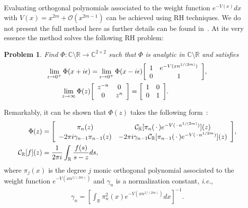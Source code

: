 \documentclass[final]{siamltex}
\newenvironment{mat}{\left[\begin{array}{ccccccccccccccc}}{\end{array}\right]}
\newtheorem{problem}{Problem}[section]
\begin{document}
Evaluating orthogonal polynomials associated to the weight function $e^{-V(x)}dx$ with $V(x) = x^{2m} + \mathcal O (x^{2m-1})$ can be achieved using RH techniques. We do not present the full method here as further details can be found in~\cite{SORHFramework, TrogdonSORMT, TrogdonSOGaussQuad}.  
At its very essence the method solves the following RH problem:
\begin{problem}\label{RHP}
Find $\Phi: \mathbb C \setminus \mathbb R \rightarrow \mathbb C^{2\times 2}$ such that $\Phi$ is analytic in $\mathbb C \setminus \mathbb R$ and satisfies
\begin{align*}
\lim_{\epsilon \rightarrow 0^+} \Phi(x + i \epsilon) &= \lim_{\epsilon \rightarrow 0^+} \Phi(x - i \epsilon) \begin{mat} 1 & e^{-V(x n^{1/(2m)})} \\ 0 & 1 \end{mat},\\
\lim_{z \rightarrow \infty} \Phi(z)& \begin{mat} z^{-n} & 0 \\ 0 & z^{n} \end{mat} = \begin{mat} 1 & 0 \\ 0 & 1 \end{mat}.
\end{align*}
\end{problem}

Remarkably, it can be shown that $\Phi(z)$ takes the following form~\cite{Deift_Book}:
\begin{align*}
\Phi(z) &=\begin{mat}
  \pi_{n}(z)& {\mathcal C}_{\mathbb R}{[\pi_{n}(\,\cdot\,) e^{-V(\,\cdot\, n^{1/(2m)})}](z)}  \\
   -2 \pi i \gamma_{n-1} \pi_{n-1}(z) &  - 2 \pi i\gamma_{n-1} {\mathcal C}_{\mathbb R}[\pi_{n-1}(\,\cdot\,) e^{-V(\,\cdot\, n^{1/2m})}](z)
\end{mat},\\
{\mathcal C}_{\mathbb R}[f](z) &= \frac{1}{2\pi i} \int_{\mathbb R} \frac{f(s)}{s-z} ds,
\end{align*}
where $\pi_j(x)$ is the degree $j$ monic orthogonal polynomial associated to the weight function $e^{-V(x n^{1/(2m)})}$ and $\gamma_n$ is a normalization constant, \emph{i.e.}, 
\begin{align*}
\gamma_n = \left[ \int_{\mathbb R} \pi_{n}^2(x) e^{-V(x n^{1/(2m)})} dx\right]^{-1}.
\end{align*}
\end{document}

